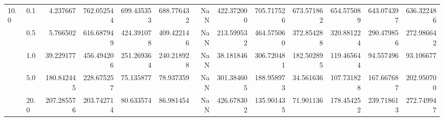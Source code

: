 \begin{tabular}{llrrrrrrrrrrr}
10.0 & 0.1  &     4.237667 &    762.052544 &   699.435353 &       688.776432 &         NaN &   422.372000 &  705.717526 &  673.571862 &  654.575089 &  643.074397 &  636.322486 \\
     & 0.5  &     5.766502 &    616.687949 &   424.391078 &       409.422146 &         NaN &   213.599532 &  464.575060 &  372.854288 &  320.881224 &  290.479856 &  272.986642 \\
     & 1.0  &    39.229177 &    456.494206 &   251.269364 &       240.218928 &         NaN &    38.181846 &  306.720481 &  182.502895 &  119.465644 &   94.557496 &   93.106677 \\
     & 5.0  &   180.842445 &    228.675257 &    75.135877 &        78.937359 &         NaN &   301.384605 &  188.958973 &   34.561636 &  107.731828 &  167.667687 &  202.950700 \\
     & 20.0 &   207.285576 &    203.742714 &    80.633574 &        86.981454 &         NaN &   426.678302 &  135.901435 &   71.901136 &  178.454252 &  239.718613 &  272.749947 \\
\bottomrule
\end{tabular}
